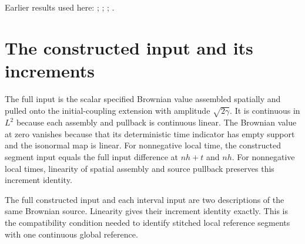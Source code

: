 \documentclass[11pt,a4paper]{article}
\begin{document}
Earlier results used here: \cite[Section~3.13.2]{LangevinLean2026ULASC}; \cite[Section~3.13.5]{LangevinLean2026ULASC}; \cite[Section~3.17.1]{LangevinLean2026ULASC}; \cite[Section~3.17.2]{LangevinLean2026ULASC}.

\section{\texorpdfstring{The constructed input and its increments}{The constructed input and its increments}}


The full input is the scalar specified Brownian value assembled spatially and pulled onto the initial-coupling extension with amplitude \(\sqrt{2\gamma}\). It is continuous in \(L^{2}\) because each assembly and pullback is continuous linear. The Brownian value at zero vanishes because that its deterministic time indicator has empty support and the isonormal map is linear. For nonnegative local time, the constructed segment input equals the full input difference at \(nh+t\) and \(nh\). For nonnegative local times, linearity of spatial assembly and source pullback preserves this increment identity.



The full constructed input and each interval input are two descriptions of the same Brownian source. Linearity gives their increment identity exactly. This is the compatibility condition needed to identify stitched local reference segments with one continuous global reference.
\end{document}
